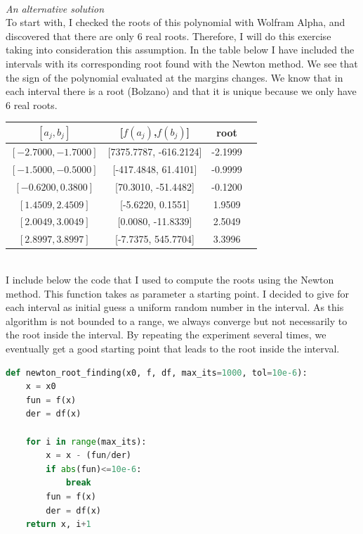 \documentclass[12pt,letterpaper]{article}
\theoremstyle{definition}
\begin{document}
\\
\textit{An alternative solution}\\
To start with, I checked the roots of this polynomial with Wolfram Alpha, and discovered that there are only 6 real roots. Therefore, I will do this exercise taking into consideration this assumption. In the table below I have included the intervals with its corresponding root found with the Newton method. We see that the sign of the polynomial evaluated at the margins changes. We know that in each interval there is a root (Bolzano) and that it is unique because we only have 6 real roots.
\begin{table}[!h]
\begin{center}
\begin{tabular}{ |c|c|c|c| }
\hline
$[a_j, b_j ]$ & [$f(a_j) $,$f(b_j)$] & root\\
\hline
$[-2.7000, -1.7000]$ & [7375.7787, -616.2124] & -2.1999\\
$[-1.5000, -0.5000]$ & [-417.4848, 61.4101] & -0.9999 \\
$[-0.6200, 0.3800]$ & [70.3010, -51.4482] & -0.1200 \\
$[1.4509, 2.4509]$ & [-5.6220, 0.1551] & 1.9509 \\
$[2.0049, 3.0049]$ & [0.0080, -11.8339] & 2.5049 \\
$[2.8997, 3.8997]$ & [-7.7375, 545.7704] & 3.3996 \\
\hline
\end{tabular}
\end{center}
\end{table}\\
I include below the code that I used to compute the roots using the Newton method. This function takes as parameter a starting point. I decided to give for each interval as initial guess a uniform random number in the interval. As this algorithm is not bounded to a range, we always converge but not necessarily to the root inside the interval. By repeating the experiment several times, we eventually get a good starting point that leads to the root inside the interval.
\begin{lstlisting}[language=Python]
def newton_root_finding(x0, f, df, max_its=1000, tol=10e-6):
    x = x0
    fun = f(x)
    der = df(x)
    
    for i in range(max_its):
        x = x - (fun/der)
        if abs(fun)<=10e-6:
            break
        fun = f(x)
        der = df(x) 
    return x, i+1
\end{lstlisting}
\end{document}

